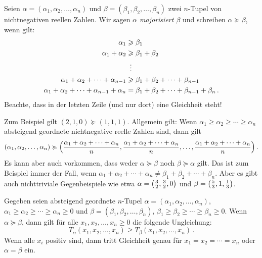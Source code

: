 \newlength{\lengthofgeqslant}
\settowidth{\lengthofgeqslant}{$\geqslant$}
\begin{definition}
	Seien $\alpha=(\alpha_1,\alpha_2,\dotsc,\alpha_n)$ und $\beta=(\beta_1,\beta_2,\dotsc,\beta_n)$ zwei $n$-Tupel von nichtnegativen reellen Zahlen. Wir sagen \emph{$\alpha$ majorisiert $\beta$} und schreiben $\alpha\succcurlyeq \beta$, wenn gilt:
	\begin{align*}
		\alpha_1&\geqslant \beta_1\\
		\alpha_1+\alpha_2&\geqslant \beta_1+\beta_2\\
		&\mathrel{\tikz[inner sep=0,outer sep=0]{\node at (0,-0.5ex) {$\phantom{=}$};\node at (0,0) {$\vdots$};}}\\
		\alpha_1+\alpha_2+\dotsb+\alpha_{n-1}&\geqslant \beta_1+\beta_2+\dotsb+\beta_{n-1}\\
		\alpha_1+\alpha_2+\dotsb+\alpha_{n-1}+\alpha_n&= \beta_1+\beta_2+\dotsb+\beta_{n-1}+\beta_n\,.
	\end{align*}
	Beachte, dass in der letzten Zeile (und nur dort) eine Gleichheit steht!
\end{definition}
Zum Beispiel gilt $(2,1,0)\succcurlyeq (1,1,1)$. Allgemein gilt: Wenn $\alpha_1\geqslant \alpha_2\geqslant \dotsb\geqslant \alpha_n$ absteigend geordnete nichtnegative reelle Zahlen sind, dann gilt
\begin{equation*}
	(\alpha_1,\alpha_2,\dotsc,\alpha_n)\succcurlyeq\parens*{\frac{\alpha_1+\alpha_2+\dotsb+\alpha_n}{n},\frac{\alpha_1+\alpha_2+\dotsb+\alpha_n}{n},\dotsc,\frac{\alpha_1+\alpha_2+\dotsb+\alpha_n}{n}}\,.
\end{equation*}
Es kann aber auch vorkommen, dass weder $\alpha\succcurlyeq\beta$ noch $\beta\succcurlyeq\alpha$ gilt. Das ist zum Beispiel immer der Fall, wenn $\alpha_1+\alpha_2+\dotsb+\alpha_n\neq\beta_1+\beta_2+\dotsb+\beta_n$. Aber es gibt auch nichttriviale Gegenbeispiele wie etwa $\alpha=\parens[\big]{\frac 32,\frac 32,0}$ und $\beta=\parens[\big]{\frac 53,1,\frac 13}$.
\begin{satzmitnamen}
	Gegeben seien absteigend geordnete $n$-Tupel $\alpha=(\alpha_1,\alpha_2,\dotsc,\alpha_n)$, $\alpha_1\geqslant \alpha_2\geqslant\dotsb\geqslant \alpha_n\geqslant 0$ und $\beta=(\beta_1,\beta_2,\dotsc,\beta_n)$, ${\beta_1\geqslant \beta_2\geqslant \dotsb\geqslant \beta_n\geqslant 0}$. Wenn $\alpha\succcurlyeq \beta$, dann gilt für alle $x_1,x_2,\dotsc,x_n\geqslant 0$ die folgende Ungleichung:
	\begin{equation*}
		T_\alpha(x_1,x_2,\dotsc,x_n)\geqslant T_\beta(x_1,x_2,\dotsc,x_n)\,.
	\end{equation*}
	Wenn alle $x_i$ positiv sind, dann tritt Gleichheit genau für $x_1=x_2=\dotsb=x_n$ oder $\alpha=\beta$ ein.
\end{satzmitnamen}
